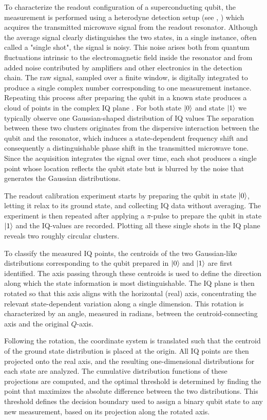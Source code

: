 To characterize the readout configuration of a superconducting qubit, the measurement is performed using a heterodyne detection setup (see \cite{gao_practical_2021}, \cite{krantz_quantum_2019}) which acquires the transmitted microwave signal from the readout resonator.
Although the average signal clearly distinguishes the two states, in a single instance, often called a "single shot", the signal is noisy. 
This noise arises both from quantum fluctuations intrinsic to the electromagnetic field inside the resonator and from added noise contributed by amplifiers and other electronics in the detection chain.
The raw signal, sampled over a finite window, is digitally integrated to produce a single complex number corresponding to one measurement instance.
Repeating this process after preparing the qubit in a known state produces a cloud of points in the complex IQ plane \cite{krantz_quantum_2019}.
For both state $\ket{0}$ and state $\ket{1}$ we typically observe one Gaussian-shaped distribution of IQ values The separation between these two clusters originates from the dispersive interaction between the qubit and the resonator, which induces a state-dependent frequency shift and consequently a distinguishable phase shift in the transmitted microwave tone. 
Since the acquisition integrates the signal over time, each shot produces a single point whose location reflects the qubit state but is blurred by the noise that generates the Gaussian distributions.

The readout calibration experiment starts by preparing the qubit in state $\ket{0}$, letting it relax to its ground state, and collecting IQ data without averaging.
The experiment is then repeated after applying a $\pi$-pulse to prepare the qubit in state $\ket{1}$ and the IQ-values are recorded.
Plotting all these single shots in the IQ plane reveals two roughly circular clusters. 

To classify the measured IQ points, the centroids of the two Gaussian-like distributions corresponding to the qubit prepared in $\ket{0}$ and $\ket{1}$ are first identified. 
The axis passing through these centroids is used to define the direction along which the state information is most distinguishable. 
The IQ plane is then rotated so that this axis aligns with the horizontal (real) axis, concentrating the relevant state-dependent variation along a single dimension. 
This rotation is characterized by an angle, measured in radians, between the centroid-connecting axis and the original $Q$-axis.

Following the rotation, the coordinate system is translated such that the centroid of the ground state distribution is placed at the origin. 
All IQ points are then projected onto the real axis, and the resulting one-dimensional distributions for each state are analyzed. 
The cumulative distribution functions of these projections are computed, and the optimal threshold is determined by finding the point that maximizes the absolute difference between the two distributions. 
This threshold defines the decision boundary used to assign a binary qubit state to any new measurement, based on its projection along the rotated axis.

